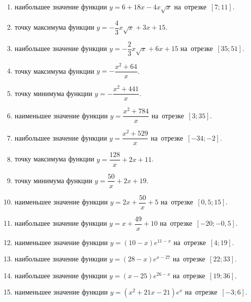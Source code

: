 \documentclass[a4paper,10pt]{article}
\begin{document}
\begin{enumerate}
\item {} наибольшее значение функции $y=6+18x -4x\sqrt{x}$ на~отрезке~$\left[7;11\right]$.

\item {} точку максимума функции $y=-\dfrac{4}{3}x\sqrt{x} +3x+15$.

\item {} наибольшее значение функции $y=-\dfrac{2}{3}x\sqrt{x} +6x+15$ на~отрезке~$\left[35;51\right]$.

\item {} точку максимума функции $y=-\dfrac{x^2 +64}{x}$.

\item {} точку минимума функции $y=-\dfrac{x^2 +441}{x}$.

\item {} наименьшее значение функции $y=\dfrac{x^2 +784}{x}$ на~отрезке~$\left[3;35\right]$.

\item {} наибольшее значение функции $y=\dfrac{x^2 +529}{x}$ на~отрезке~$\left[-34;-2\right]$.

\item {} точку максимума функции $y=\dfrac{128}{x} +2x+11$.

\item {} точку минимума функции $y=\dfrac{50}{x} +2x+19$.

\item {} наименьшее значение функции $y=2x+\dfrac{50}{x} +5$ на~отрезке~$\left[0,5;15\right]$.

\item {} наибольшее значение функции $y=x+\dfrac{49}{x} +10$ на~отрезке~$\left[-20;-0,5\right]$.

\item {} наименьшее значение функции $y=\left(10-x\right)e^{11-x}$ на~отрезке~$\left[4;19\right]$.

\item {} наибольшее значение функции $y=\left(28-x\right)e^{x-27}$ на~отрезке~$\left[22;33\right]$.

\item {} наибольшее значение функции $y=\left(x-25\right)e^{26-x}$ на~отрезке~$\left[19;36\right]$.

\item {} наименьшее значение функции $y=\left(x^2 +21x -21\right)e^{x }$ на~отрезке~$\left[-3;6\right]$.


\end{enumerate}
\end{document}
